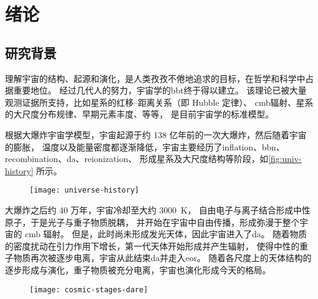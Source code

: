 
\chapter{绪论}
\label{chap:introduction}

\section{研究背景}

理解宇宙的结构、起源和演化，是人类孜孜不倦地追求的目标，在哲学和科学中占据重要地位。
经过几代人的努力，宇宙学的\ac{bbt}终于得以建立。
该理论已被大量观测证据所支持，比如星系的红移--距离关系（即 Hubble 定律）、
\ac{cmb}辐射、星系的大尺度分布规律、早期元素丰度、等等，
是目前宇宙学的标准模型。

根据大爆炸宇宙学模型，宇宙起源于约 138 亿年前的一次大爆炸，然后随着宇宙的膨胀，
温度以及能量密度都逐渐降低，宇宙主要经历了\ac{inflation}、\ac{bbn}、
\ac{recombination}、\ac{da}、\ac{reionization}、
形成星系及大尺度结构等阶段，如\autoref{fig:univ-history} 所示。

\begin{figure}[htp]
  \centering
  \texttt{[image: universe-history]}
  \label{fig:univ-history}
\end{figure}

大爆炸之后约 40 万年，宇宙冷却至大约 \SI{3000}{\kelvin}，
自由电子与离子结合形成中性原子，于是光子与重子物质脱耦，
并开始在宇宙中自由传播，形成弥漫于整个宇宙的 \ac{cmb} 辐射。
但是，此时尚未形成发光天体，因此宇宙进入了\ac{da}。
随着物质的密度扰动在引力作用下增长，第一代天体开始形成并产生辐射，
使得中性的重子物质再次被逐步电离，宇宙从此结束\ac{da}并走入\ac{eor}。
随着各尺度上的天体结构的逐步形成与演化，重子物质被充分电离，宇宙也演化形成今天的格局。

\begin{figure}[htp]
  \centering
  \texttt{[image: cosmic-stages-dare]}
  \label{fig:cosmic-stages}
\end{figure}

